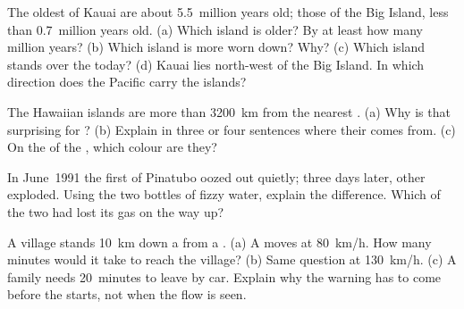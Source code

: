 \begin{exercise}[$\star\star$]\label{exo:g7:volcanoes:8}
The oldest  of Kauai are about 5.5~million years old; those of the Big
Island, less than 0.7~million years old. (a) Which island is older? By at
least how many million years? (b) Which island is more worn down? Why?
(c) Which island stands over the  today? (d) Kauai lies north-west
of the Big Island. In which direction does the Pacific  carry the
islands?
\end{exercise}

\begin{exercise}[$\star\star$]\label{exo:g7:volcanoes:9}
The Hawaiian islands are more than \qty{3200}{km} from the nearest . (a) Why is that surprising for ? (b) Explain in three or
four sentences where their  comes from. (c) On the  of the
, which colour are they?
\end{exercise}

\begin{exercise}[$\star\star$]\label{exo:g7:volcanoes:10}
In June~1991 the first  of Pinatubo oozed out quietly; three days
later, other  exploded. Using the two bottles of fizzy water, explain
the difference. Which of the two  had lost its gas on the way up?
\end{exercise}

\begin{exercise}[$\star\star\star$]\label{exo:g7:volcanoes:11}
A village stands \qty{10}{km} down a  from a . (a) A
 moves at \qty{80}{km/h}. How many minutes would it take
to reach the village? (b) Same question at \qty{130}{km/h}. (c) A family
needs 20~minutes to leave by car. Explain why the warning has to come
before the  starts, not when the flow is seen.
\end{exercise}

